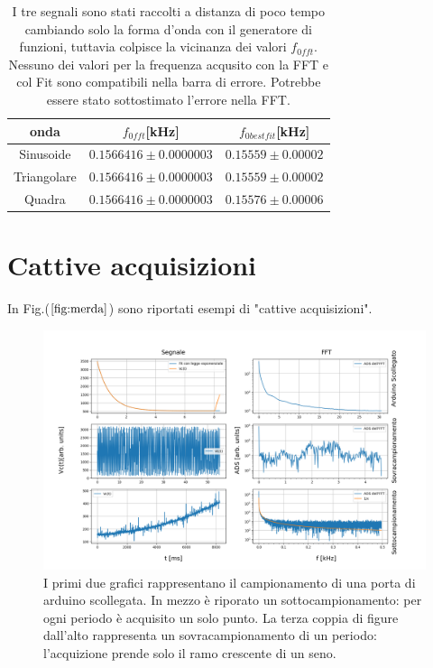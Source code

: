 \documentclass{article}
\begin{document}
        \begin{table}[H]
            \centering

                \begin{tabular}{ccc}
                    onda            &   $f_{0fft}$[kHz]                     & $f_{0bestfit}$[kHz] \\
                    \hline
                    Sinusoide       &   $0.1566416 \pm 0.0000003$           & $0.15559 \pm 0.00002$ \\
                    Triangolare     &   $0.1566416 \pm 0.0000003$           & $0.15559 \pm 0.00002$ \\
                    Quadra          &   $0.1566416 \pm 0.0000003$           & $0.15576 \pm 0.00006$ \\
                \end{tabular}
                \caption{I tre segnali sono stati raccolti a distanza di poco tempo
                cambiando solo la forma d'onda con il generatore di funzioni,
                tuttavia colpisce la vicinanza dei valori $f_{0fft}$.
                Nessuno dei valori per la frequenza acqusito con la FFT
                e col Fit sono compatibili nella barra di errore.
                Potrebbe essere stato sottostimato l'errore nella FFT.}
                \label{tab:for_dis}
        \end{table}

\section{Cattive acquisizioni}

    In Fig.($\ref{fig:merda}$) sono riportati esempi di "cattive acquisizioni".

        \begin{figure}[H]
            \centering
            \includegraphics[width=\textwidth]{FFT5/FFTwaveforms4.png}
            \caption{I primi due grafici rappresentano il campionamento di una porta di arduino scollegata.
            In mezzo è riporato un sottocampionamento: per ogni periodo è acquisito un 
            solo punto.
            La terza coppia di figure dall'alto rappresenta un sovracampionamento 
            di un periodo: l'acquizione prende  solo il ramo crescente di un seno.}
            \label{fig:merda}
        \end{figure}  
    
\end{document}
